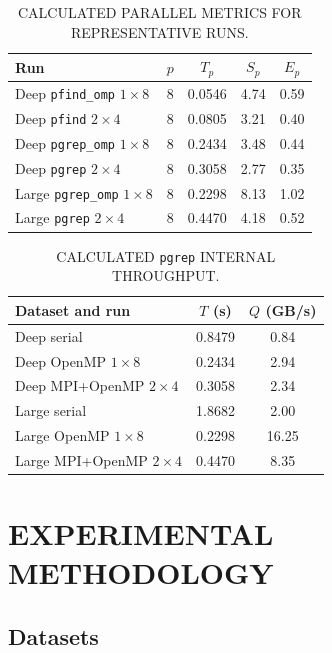 \documentclass[twocolumn,10pt]{asme2e}
\begin{document}
\begin{table}[t]
\caption{CALCULATED PARALLEL METRICS FOR REPRESENTATIVE RUNS.}
\begin{center}
\label{tab_metric_calc}
\scriptsize
\begin{tabular}{l c c c c}
\hline
Run & $p$ & $T_p$ & $S_p$ & $E_p$ \\
\hline
Deep \texttt{pfind\_omp} $1\times8$ & 8 & 0.0546 & 4.74 & 0.59 \\
Deep \texttt{pfind} $2\times4$ & 8 & 0.0805 & 3.21 & 0.40 \\
Deep \texttt{pgrep\_omp} $1\times8$ & 8 & 0.2434 & 3.48 & 0.44 \\
Deep \texttt{pgrep} $2\times4$ & 8 & 0.3058 & 2.77 & 0.35 \\
Large \texttt{pgrep\_omp} $1\times8$ & 8 & 0.2298 & 8.13 & 1.02 \\
Large \texttt{pgrep} $2\times4$ & 8 & 0.4470 & 4.18 & 0.52 \\
\hline
\end{tabular}
\end{center}
\end{table}

\begin{table}[t]
\caption{CALCULATED \texttt{pgrep} INTERNAL THROUGHPUT.}
\begin{center}
\label{tab_throughput_calc}
\scriptsize
\begin{tabular}{l c c}
\hline
Dataset and run & $T$ (s) & $Q$ (GB/s) \\
\hline
Deep serial & 0.8479 & 0.84 \\
Deep OpenMP $1\times8$ & 0.2434 & 2.94 \\
Deep MPI+OpenMP $2\times4$ & 0.3058 & 2.34 \\
Large serial & 1.8682 & 2.00 \\
Large OpenMP $1\times8$ & 0.2298 & 16.25 \\
Large MPI+OpenMP $2\times4$ & 0.4470 & 8.35 \\
\hline
\end{tabular}
\end{center}
\end{table}

\section*{EXPERIMENTAL METHODOLOGY}

\subsection*{Datasets}
\end{document}
